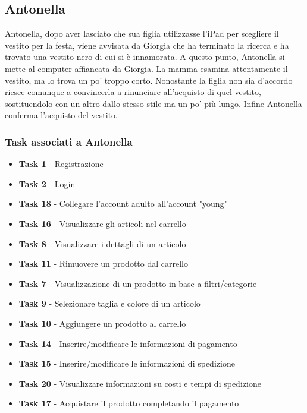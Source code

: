 \documentclass[12pt,a4paper]{report}
\begin{document}
\subsection*{Antonella}
Antonella, dopo aver lasciato che sua figlia utilizzasse l'iPad per scegliere il vestito per la festa, viene avvisata da Giorgia che ha terminato la ricerca e ha trovato una vestito nero di cui si è innamorata. A questo punto, Antonella si mette al computer affiancata da Giorgia. La mamma esamina attentamente il vestito, ma lo trova un po' troppo corto. Nonostante la figlia non sia d'accordo riesce comunque a convincerla a rinunciare all’acquisto di quel vestito, sostituendolo con un altro dallo stesso stile ma un po' più lungo. Infine Antonella conferma l’acquisto del vestito.
\subsubsection*{Task associati a Antonella}
\begin{itemize}
\item \textbf{Task 1} - Registrazione
\item \textbf{Task 2} - Login
\item \textbf{Task 18} - Collegare l'account adulto all'account "young"
\item \textbf{Task 16} - Visualizzare gli articoli nel carrello
\item \textbf{Task 8} - Visualizzare i dettagli di un articolo
\item \textbf{Task 11} - Rimuovere un prodotto dal carrello
\item \textbf{Task 7} - Visualizzazione di un prodotto in base a filtri/categorie
\item \textbf{Task 9} - Selezionare taglia e colore di un articolo
\item \textbf{Task 10} - Aggiungere un prodotto al carrello
\item \textbf{Task 14} - Inserire/modificare le informazioni di pagamento
\item \textbf{Task 15} - Inserire/modificare le informazioni di spedizione
\item \textbf{Task 20} - Visualizzare informazioni su costi e tempi di spedizione
\item \textbf{Task 17} - Acquistare il prodotto completando il pagamento
\end{itemize}
\end{document}
